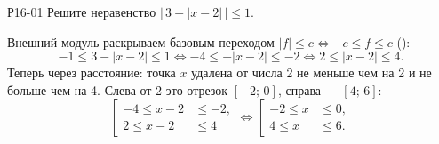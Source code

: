 
\begin{razbor}{Р16-01}
\Uslovie Решите неравенство $\bigl|\,3-|x-2|\,\bigr|\leqslant 1$.

\Reshenie Внешний модуль раскрываем базовым переходом $|f|\leqslant c \iff -c\leqslant f\leqslant c$
():
\[
  -1\leqslant 3-|x-2|\leqslant 1
  \iff -4\leqslant -|x-2|\leqslant -2
  \iff 2\leqslant |x-2|\leqslant 4.
\]
Теперь через расстояние: точка $x$ удалена от числа 2 не меньше чем на 2
и не больше чем на 4. Слева от 2 это отрезок $[-2;\,0]$, справа — $[4;\,6]$:
\[
  \left[\begin{aligned} -4\leqslant x-2&\leqslant -2,\\ 2\leqslant x-2&\leqslant 4\end{aligned}\right.
  \iff
  \left[\begin{aligned} -2\leqslant x&\leqslant 0,\\ 4\leqslant x&\leqslant 6.\end{aligned}\right.
\]
\end{razbor}
